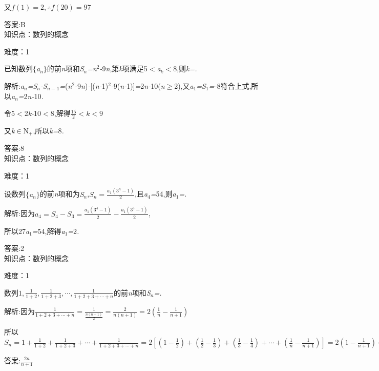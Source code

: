 \documentclass{article} %
\begin{document}
又$f(1)=2, \therefore f(20)=97$

 答案:B \\

知识点：数列的概念

难度：1

 已知数列$\mathrm{\{}$\textit{a${}_{n}$}$\mathrm{\}}$的前\textit{n}项和\textit{S${}_{n}$=n}${}^{2}$\textit{-}9\textit{n},第\textit{k}项满足5\textit{$<$a${}_{k}$$<$}8,则\textit{k=\underbar{　　　　　}.~}

 解析:\textit{a${}_{n}$=S${}_{n}$-S${}_{n-}$}${}_{1}$\textit{=}(\textit{n}${}^{2}$\textit{-}9\textit{n})\textit{-}[(\textit{n-}1)${}^{2}$\textit{-}9(\textit{n-}1)]\textit{=}2\textit{n-}10(\textit{n}$\mathrm{\ge}$2),又\textit{a}${}_{1}$\textit{=S}${}_{1}$\textit{=-}8符合上式,所以\textit{a${}_{n}$=}2\textit{n-}10\textit{.}

令5\textit{$<$}2\textit{k-}10\textit{$<$}8,解得$\frac{15}{2}<k<9$

又\textit{k}$\mathrm{\in}$N\textit{${}_{+}$},所以\textit{k=}8\textit{.}

 答案:8 \\

知识点：数列的概念

难度：1

 设数列$\mathrm{\{}$\textit{a${}_{n}$}$\mathrm{\}}$的前\textit{n}项和为\textit{S${}_{n}$},$S_n=\frac{a_1(3^n-1)}{2}$,且\textit{a}${}_{4}$\textit{=}54,则\textit{a}${}_{1}$\textit{=\underbar{　　　　　}.~}

 解析:因为$a_4=S_4-S_3=\frac{a_1(3^4-1)}{2}-\frac{a_1(3^3-1)}{2}$,

所以27\textit{a}${}_{1}$\textit{=}54,解得\textit{a}${}_{1}$\textit{=}2\textit{.}

 答案:2 \\

知识点：数列的概念

难度：1

 数列$1,\frac{1}{1+2},\frac{1}{1+2+3},\cdots, \frac{1}{1+2+3+\cdots+n}$的前\textit{n}项和\textit{S${}_{n}$=\underbar{　　　　　　　}.~}

 解析:因为$\frac{1}{1+2+3+\cdots+n}=\frac{1}{\frac{n(n+1)}{2}}=\frac{2}{n(n+1)}=2(\frac{1}{n}-\frac{1}{n+1})$

所以$S_n=1+\frac{1}{1+2}+\frac{1}{1+2+3}+\cdots+\frac{1}{1+2+3+\cdots+n}=2[(1-\frac{1}{2})+(\frac{1}{2}-\frac{1}{3})+(\frac{1}{3}-\frac{1}{4})+\cdots+(\frac{1}{n}-\frac{1}{n+1})]=2(1-\frac{1}{n+1})=\frac{2n}{n+1}$

 答案:$\frac{2n}{n+1}$ \\
\end{document}
